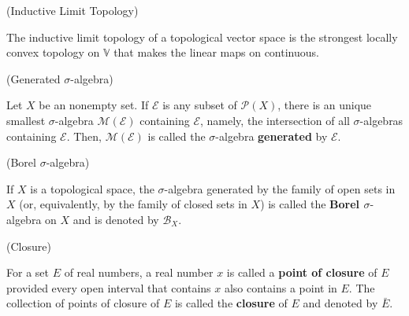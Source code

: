 \begin{definition}{(Inductive Limit Topology) \cite{gheondea2016locally}}

The inductive limit topology of a topological vector space is the strongest locally convex topology on $\mathbb{V}$ that makes the linear maps on continuous.

\end{definition}
\vspace{0.1in}


\begin{definition}{(Generated $\sigma$-algebra) \cite{folland2013real}}

Let $X$ be an nonempty set. If $\mathcal{E}$ is any subset of $ \mathcal{P}(X)$, there is an unique smallest $\sigma$-algebra $\mathcal{M}(\mathcal{E})$ containing $\mathcal{E}$, namely, the intersection of all $\sigma$-algebras containing $\mathcal{E}$. Then, $\mathcal{M}(\mathcal{E})$ is called the $\sigma$-algebra \textbf{generated} by $\mathcal{E}$.

\end{definition}
\vspace{0.1in}

\begin{definition}{(Borel $\sigma$-algebra) \cite{folland2013real}}

If $X$ is a topological space, the $\sigma$-algebra generated by the family of open sets in $X$ (or, equivalently, by the family of closed sets in $X$) is called the \textbf{Borel $\sigma$}-algebra on $X$ and is denoted by $\mathcal{B}_{X}$.

\end{definition}
\vspace{0.1in}

\begin{definition}{(Closure) \cite{royden1988real}}

For a set $E$ of real numbers, a real number $x$ is called a \textbf{point of closure} of $E$ provided every open interval that contains $x$ also contains a point in $E$. The collection of points of closure of $E$ is called the \textbf{closure} of $E$ and denoted by $\bar{E}$.

\end{definition}
\vspace{0.1in}

